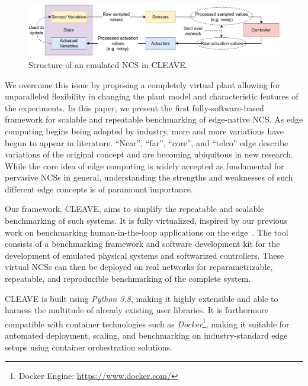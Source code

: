 \begin{figure}
    \centering
    \includegraphics[width=.8\textwidth]{publications/2022CLEAVE/images/CLEAVE_NCS_structure}
    \caption{
        Structure of an emulated \acl*{NCS} in \acs*{CLEAVE}.
    }\label{fig:cleave:ncs:struct}
\end{figure}

We overcome this issue by proposing a completely virtual plant allowing for unparalleled flexibility in changing the plant model and characteristic features of the experiments.
In this paper, we present the first fully-software-based framework for scalable and repeatable benchmarking of edge-native \ac{NCS}.
As edge computing begins being adopted by industry, more and more variations have begun to appear in literature.
``Near'', ``far'', ``core'', and ``telco'' edge describe variations of the original concept and are becoming ubiquitous in new research.
While the core idea of edge computing is widely accepted as fundamental for pervasive \acp{NCS} in general, understanding the strengths and weaknesses of such different edge concepts is of paramount importance.

Our framework, \ac{CLEAVE}, aims to simplify the repeatable and scalable benchmarking of such systems.
It is fully virtualized, inspired by our previous work on benchmarking human-in-the-loop applications on the edge~\cite{Olguin2019EdgeDroid}.
The tool consists of a benchmarking framework and software development kit for the development of emulated physical systems and softwarized controllers.
These virtual \acp{NCS} can then be deployed on real networks for reparametrizable, repeatable, and reproducible benchmarking of the complete system.

\ac{CLEAVE} is built using \emph{Python 3.8}, making it highly extensible and able to harness the multitude of already existing user libraries.
It is furthermore compatible with container technologies such as \emph{Docker}\footnote{Docker Engine: \url{https://www.docker.com/}}, making it suitable for automated deployment, scaling, and benchmarking on industry-standard edge setups using container orchestration solutions.


